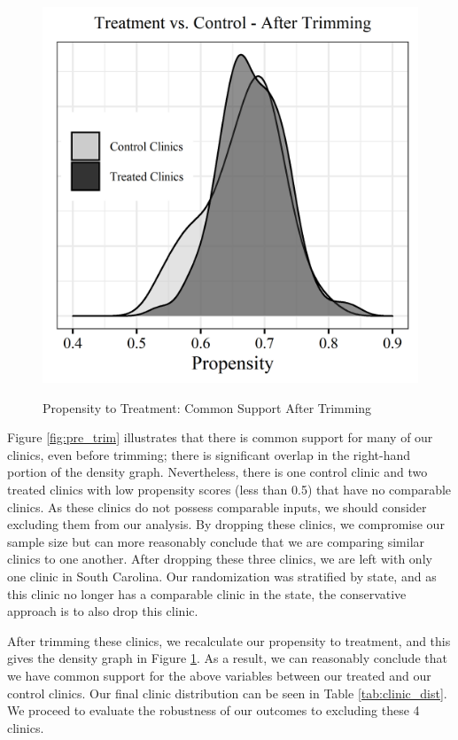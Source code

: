  \begin{figure}
     \centering
     \caption{Propensity to Treatment: Common Support After Trimming} %
     \includegraphics[scale=1]{Figures/CC/Figure C.1 (right).png}     
     \label{fig:post_trim}
 \end{figure} 

Figure \ref{fig:pre_trim} illustrates that there is common support for many of our clinics, even before trimming; there is significant overlap in the right-hand portion of the density graph. Nevertheless, there is one control clinic and two treated clinics with low propensity scores (less than 0.5) that have no comparable clinics. As these clinics do not possess comparable inputs, we should consider excluding them from our analysis. By dropping these clinics, we compromise our sample size but can more reasonably conclude that we are comparing similar clinics to one another. After dropping these three clinics, we are left with only one clinic in South Carolina. Our randomization was stratified by state, and as this clinic no longer has a comparable clinic in the state, the conservative approach is to also drop this clinic. 

After trimming these clinics, we recalculate our propensity to treatment, and this gives the density graph in Figure \ref{fig:post_trim}. As a result, we can reasonably conclude that we have common support for the above variables between our treated and our control clinics. Our final clinic distribution can be seen in Table \ref{tab:clinic_dist}. We proceed to evaluate the robustness of our outcomes to excluding these 4 clinics.

